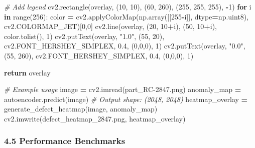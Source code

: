 \documentclass[
]{article}
\newenvironment{Shaded}{\begin{snugshade}}{\end{snugshade}}
\newcommand{\BuiltInTok}[1]{#1}
\newcommand{\CommentTok}[1]{\textcolor[rgb]{0.56,0.35,0.01}{\textit{#1}}}
\newcommand{\ControlFlowTok}[1]{\textcolor[rgb]{0.13,0.29,0.53}{\textbf{#1}}}
\newcommand{\DecValTok}[1]{\textcolor[rgb]{0.00,0.00,0.81}{#1}}
\newcommand{\FloatTok}[1]{\textcolor[rgb]{0.00,0.00,0.81}{#1}}
\newcommand{\KeywordTok}[1]{\textcolor[rgb]{0.13,0.29,0.53}{\textbf{#1}}}
\newcommand{\NormalTok}[1]{#1}
\newcommand{\OperatorTok}[1]{\textcolor[rgb]{0.81,0.36,0.00}{\textbf{#1}}}
\newcommand{\StringTok}[1]{\textcolor[rgb]{0.31,0.60,0.02}{#1}}
\begin{document}
\begin{Shaded}
\begin{Highlighting}[]
    \CommentTok{\# Add legend}
\NormalTok{    cv2.rectangle(overlay, (}\DecValTok{10}\NormalTok{, }\DecValTok{10}\NormalTok{), (}\DecValTok{60}\NormalTok{, }\DecValTok{260}\NormalTok{), (}\DecValTok{255}\NormalTok{, }\DecValTok{255}\NormalTok{, }\DecValTok{255}\NormalTok{), }\OperatorTok{{-}}\DecValTok{1}\NormalTok{)}
    \ControlFlowTok{for}\NormalTok{ i }\KeywordTok{in} \BuiltInTok{range}\NormalTok{(}\DecValTok{256}\NormalTok{):}
\NormalTok{        color }\OperatorTok{=}\NormalTok{ cv2.applyColorMap(np.array([[}\DecValTok{255}\OperatorTok{{-}}\NormalTok{i]], dtype}\OperatorTok{=}\NormalTok{np.uint8), cv2.COLORMAP\_JET)[}\DecValTok{0}\NormalTok{,}\DecValTok{0}\NormalTok{]}
\NormalTok{        cv2.line(overlay, (}\DecValTok{20}\NormalTok{, }\DecValTok{10}\OperatorTok{+}\NormalTok{i), (}\DecValTok{50}\NormalTok{, }\DecValTok{10}\OperatorTok{+}\NormalTok{i), color.tolist(), }\DecValTok{1}\NormalTok{)}
\NormalTok{    cv2.putText(overlay, }\StringTok{"1.0"}\NormalTok{, (}\DecValTok{55}\NormalTok{, }\DecValTok{20}\NormalTok{), cv2.FONT\_HERSHEY\_SIMPLEX, }\FloatTok{0.4}\NormalTok{, (}\DecValTok{0}\NormalTok{,}\DecValTok{0}\NormalTok{,}\DecValTok{0}\NormalTok{), }\DecValTok{1}\NormalTok{)}
\NormalTok{    cv2.putText(overlay, }\StringTok{"0.0"}\NormalTok{, (}\DecValTok{55}\NormalTok{, }\DecValTok{260}\NormalTok{), cv2.FONT\_HERSHEY\_SIMPLEX, }\FloatTok{0.4}\NormalTok{, (}\DecValTok{0}\NormalTok{,}\DecValTok{0}\NormalTok{,}\DecValTok{0}\NormalTok{), }\DecValTok{1}\NormalTok{)}

    \ControlFlowTok{return}\NormalTok{ overlay}

\CommentTok{\# Example usage}
\NormalTok{image }\OperatorTok{=}\NormalTok{ cv2.imread(}\StringTok{\textquotesingle{}part\_RC{-}2847.png\textquotesingle{}}\NormalTok{)}
\NormalTok{anomaly\_map }\OperatorTok{=}\NormalTok{ autoencoder.predict(image)  }\CommentTok{\# Output shape: (2048, 2048)}
\NormalTok{heatmap\_overlay }\OperatorTok{=}\NormalTok{ generate\_defect\_heatmap(image, anomaly\_map)}
\NormalTok{cv2.imwrite(}\StringTok{\textquotesingle{}defect\_heatmap\_2847.png\textquotesingle{}}\NormalTok{, heatmap\_overlay)}
\end{Highlighting}
\end{Shaded}

\hypertarget{performance-benchmarks}{%
\subsubsection{4.5 Performance
Benchmarks}\label{performance-benchmarks}}
\end{document}

